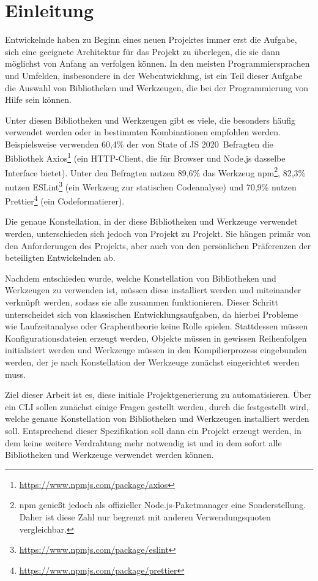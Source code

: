 \section{Einleitung}
Entwickelnde haben zu Beginn eines neuen Projektes immer erst die Aufgabe, sich eine geeignete Architektur für das Projekt zu überlegen, die sie dann möglichst von Anfang an verfolgen können. In den meisten Programmiersprachen und Umfelden, insbesondere in der Webentwicklung, ist ein Teil dieser Aufgabe die Auswahl von Bibliotheken und Werkzeugen, die bei der Programmierung von Hilfe sein können.

Unter diesen Bibliotheken und Werkzeugen gibt es viele, die besonders häufig verwendet werden oder in bestimmten Kombinationen empfohlen werden. Beispielsweise verwenden 60,4\% der von \glqq State of JS 2020\grqq\ Befragten die Bibliothek Axios\footnote{\url{https://www.npmjs.com/package/axios}} (ein HTTP-Client, die für Browser und Node.js dasselbe Interface bietet)\cite{stateofjs}. Unter den Befragten nutzen 89,6\% das Werkzeug \gls{npm}\footnote{\gls{npm} genießt jedoch als offizieller Node.js-Paketmanager eine Sonderstellung. Daher ist diese Zahl nur begrenzt mit anderen Verwendungsquoten vergleichbar.}, 82,3\% nutzen ESLint\footnote{\url{https://www.npmjs.com/package/eslint}} (ein Werkzeug zur statischen Codeanalyse) und 70,9\% nutzen Prettier\footnote{\url{https://www.npmjs.com/package/prettier}} (ein Codeformatierer).

Die genaue Konstellation, in der diese Bibliotheken und Werkzeuge verwendet werden, unterschieden sich jedoch von Projekt zu Projekt. Sie hängen primär von den Anforderungen des Projekts, aber auch von den persönlichen Präferenzen der beteiligten Entwickelnden ab.

Nachdem entschieden wurde, welche Konstellation von Bibliotheken und Werkzeugen zu verwenden ist, müssen diese installiert werden und miteinander verknüpft werden, sodass sie alle zusammen funktionieren. Dieser Schritt unterscheidet sich von klassischen Entwicklungsaufgaben, da hierbei Probleme wie Laufzeitanalyse oder Graphentheorie keine Rolle spielen. Stattdessen müssen Konfigurationsdateien erzeugt werden, Objekte müssen in gewissen Reihenfolgen initialisiert werden und Werkzeuge müssen in den Kompilierprozess eingebunden werden, der je nach Konstellation der Werkzeuge zunächst eingerichtet werden muss.

Ziel dieser Arbeit ist es, diese initiale Projektgenerierung zu automatisieren. Über ein \gls{CLI} sollen zunächst einige Fragen gestellt werden, durch die festgestellt wird, welche genaue Konstellation von Bibliotheken und Werkzeugen installiert werden soll. Entsprechend dieser Spezifikation soll dann ein Projekt erzeugt werden, in dem keine weitere Verdrahtung mehr notwendig ist und in dem sofort alle Bibliotheken und Werkzeuge verwendet werden können.

